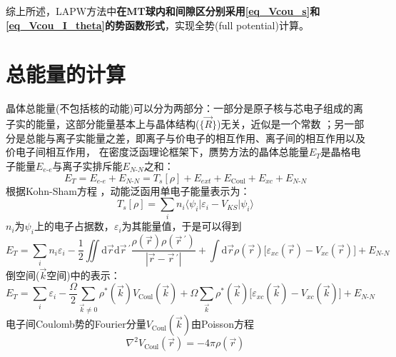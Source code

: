 综上所述，\textrm{LAPW}方法中\textbf{在\textrm{MT}球内和间隙区分别采用\eqref{eq_Vcou_s}和\eqref{eq_Vcou_I_theta}的势函数形式}，实现全势(\textrm{full potential})\cite{PRB26-4571_1982,PRB33-823_1986}计算。

\section{总能量的计算}
晶体总能量(不包括核的动能)可以分为两部分：一部分是原子核与芯电子组成的离子实的能量，这部分能量基本上与晶体结构($\{\vec R\}$)无关，近似是一个常数%
；另一部分是总能与离子实能量之差，即离子与价电子的相互作用、离子间的相互作用以及价电子间相互作用，%
在密度泛函理论框架下，赝势方法的晶体总能量$E_T$是晶格电子能量$E_{e\textrm{-}e}$与离子实排斥能$E_{N\textrm{-}N}$之和：
\begin{equation}
  E_T=E_{e\textrm{-}e}+E_{N\textrm{-}N}=T_s[\rho]+E_{ext}+E_{\mathrm{Coul}}+E_{xc}+E_{N\textrm{-}N}
  \label{eq:solid-total}
\end{equation}
根据Kohn-Sham方程%
，动能泛函用单电子能量表示为：
\begin{equation}
  T_s[\rho]=\sum_in_i\langle\psi_i|\varepsilon_i-V_{KS}|\psi_i\rangle
  \label{eq:solid-49}
\end{equation}
$n_i$为$\psi_i$上的电子占据数，$\varepsilon_i$为其能量值，于是可以得到
\begin{equation}
	E_T=\sum_in_i\varepsilon_i-\frac12\iint \mathrm{d}\vec r\mathrm{d}\vec r\,^\prime\dfrac{\rho(\vec r)\rho(\vec r\,^\prime)}{|\vec r-\vec r\,^\prime|}+\int \mathrm{d}\vec r\rho(\vec r)\big[\varepsilon_{xc}(\vec r)-V_{xc}(\vec r)\big]+E_{N\textrm{-}N}
  \label{eq:solid-50}
\end{equation}
倒空间($\vec k$空间)中的表示：
\begin{equation}
  E_T=\sum_i\varepsilon_i-\frac{\Omega}2\sum_{\vec k\neq0}\rho^{\ast}(\vec k)V_{\mathrm{Coul}}(\vec k)+\Omega\sum_{\vec k}\rho^{\ast}(\vec k)\big[\varepsilon_{xc}(\vec k)-V_{xc}(\vec k)\big]+E_{N\textrm{-}N}
  \label{eq:solid-51}
\end{equation}
电子间Coulomb势的Fourier分量$V_{\mathrm{Coul}}(\vec k)$由Poisson方程
\begin{equation}
  \nabla^2V_{\mathrm{Coul}}(\vec r)=-4\pi\rho(\vec r)
  \label{eq:poisson-r}
\end{equation}
